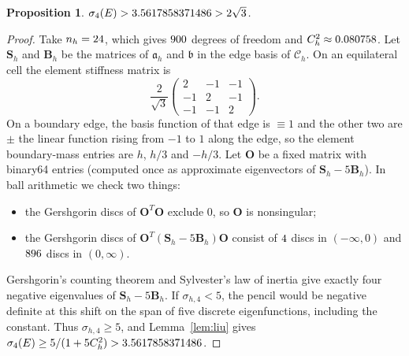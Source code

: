 \documentclass[11pt]{article}
\newtheorem{proposition}[theorem]{Proposition}
\theoremstyle{definition}
\theoremstyle{remark}
\begin{document}
\begin{proposition}\label{prop:cr}
$\sigma_4(E)>3.5617858371486>2\sqrt3$.
\end{proposition}
\begin{proof}
Take $n_h=24$, which gives $900$ degrees of freedom and $C_h^2\approx0.080758$. Let $\mathbf S_h$ and
$\mathbf B_h$ be the matrices of $\mathfrak a_h$ and $\mathfrak b$ in the edge basis of $\mathcal C_h$. On an
equilateral cell the element stiffness matrix is
\[\frac{2}{\sqrt3}\begin{pmatrix}2&-1&-1\\-1&2&-1\\-1&-1&2\end{pmatrix}.\]
On a boundary edge, the basis function of that edge is $\equiv1$ and the other two are $\pm$ the linear function
rising from $-1$ to $1$ along the edge, so the element boundary-mass entries are $h$, $h/3$ and $-h/3$. Let $\mathbf O$ be a fixed matrix with binary64 entries (computed once as approximate
eigenvectors of $\mathbf S_h-5\mathbf B_h$). In ball arithmetic we check two things:
\begin{itemize}
\item the Gershgorin discs of $\mathbf O^T\mathbf O$ exclude $0$, so $\mathbf O$ is nonsingular;
\item the Gershgorin discs of $\mathbf O^T(\mathbf S_h-5\mathbf B_h)\mathbf O$ consist of $4$ discs in
$(-\infty,0)$ and $896$ discs in $(0,\infty)$.
\end{itemize}
Gershgorin's counting theorem and Sylvester's law of inertia give exactly four negative eigenvalues of
$\mathbf S_h-5\mathbf B_h$. If $\sigma_{h,4}<5$, the pencil would be negative definite at this shift on
the span of five discrete eigenfunctions, including the constant. Thus $\sigma_{h,4}\ge5$, and
Lemma~\ref{lem:liu} gives $\sigma_4(E)\ge5/(1+5C_h^2)>3.5617858371486$.
\end{proof}
\end{document}
